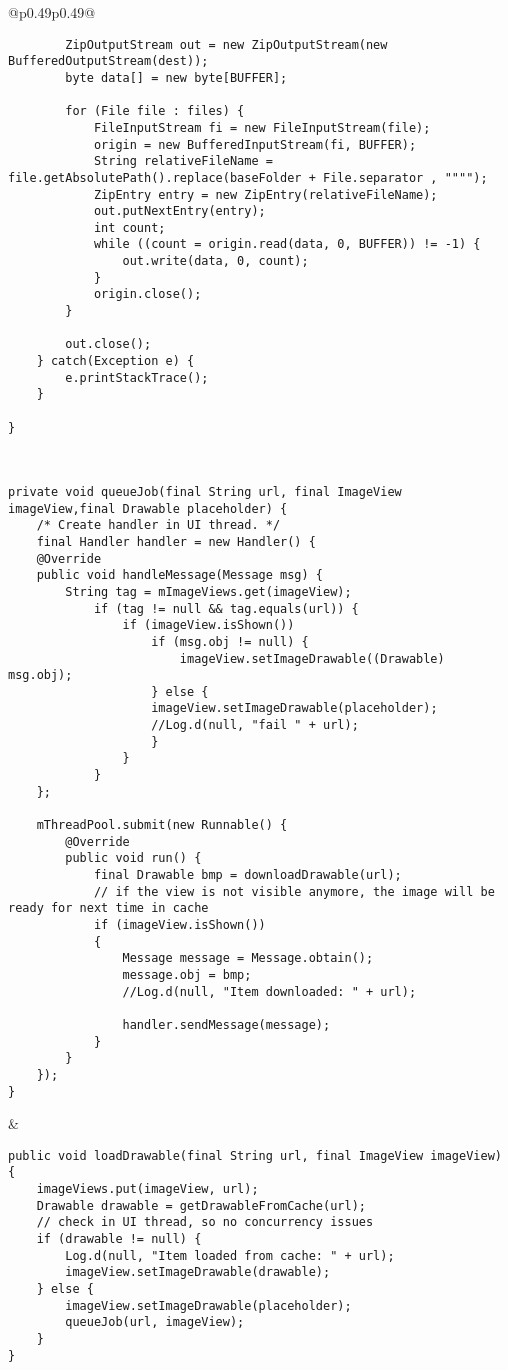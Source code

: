 \begin{table*}
\begin{tabular}{@{}p{}p{}@{}}
\begin{lstlisting}
		ZipOutputStream out = new ZipOutputStream(new BufferedOutputStream(dest));
		byte data[] = new byte[BUFFER];

		for (File file : files) {
			FileInputStream fi = new FileInputStream(file);
			origin = new BufferedInputStream(fi, BUFFER);
			String relativeFileName = file.getAbsolutePath().replace(baseFolder + File.separator , """");
			ZipEntry entry = new ZipEntry(relativeFileName);
			out.putNextEntry(entry);
			int count;
			while ((count = origin.read(data, 0, BUFFER)) != -1) {
				out.write(data, 0, count);
			}
			origin.close();
		}

		out.close();
	} catch(Exception e) {
		e.printStackTrace();
	}

}
\end{lstlisting}
\\

\bottomrule

\begin{lstlisting}
private void queueJob(final String url, final ImageView imageView,final Drawable placeholder) {
	/* Create handler in UI thread. */
	final Handler handler = new Handler() {
	@Override
	public void handleMessage(Message msg) {
		String tag = mImageViews.get(imageView);
			if (tag != null && tag.equals(url)) {
				if (imageView.isShown())
					if (msg.obj != null) {
						imageView.setImageDrawable((Drawable) msg.obj);
					} else {
					imageView.setImageDrawable(placeholder);
					//Log.d(null, "fail " + url);
					}
				}
			}
	};

	mThreadPool.submit(new Runnable() {
		@Override
		public void run() {
			final Drawable bmp = downloadDrawable(url);
			// if the view is not visible anymore, the image will be ready for next time in cache
			if (imageView.isShown())
			{
				Message message = Message.obtain();
				message.obj = bmp;
				//Log.d(null, "Item downloaded: " + url);

				handler.sendMessage(message);
			}
		}
	});
}
\end{lstlisting}


&


\begin{lstlisting}
public void loadDrawable(final String url, final ImageView imageView) {
	imageViews.put(imageView, url);
	Drawable drawable = getDrawableFromCache(url);
	// check in UI thread, so no concurrency issues
	if (drawable != null) {
		Log.d(null, "Item loaded from cache: " + url);
		imageView.setImageDrawable(drawable);
	} else {
		imageView.setImageDrawable(placeholder);
		queueJob(url, imageView);
	}
}
\end{lstlisting}




\end{tabular}
\end{table*}
